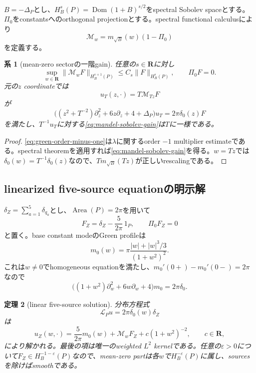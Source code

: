 \documentclass[11pt,a4paper]{ltjsarticle}
\newtheorem{theorem}{定理}[section]
\newtheorem{corollary}[theorem]{系}
\theoremstyle{definition}
\theoremstyle{remark}
\newcommand{\RR}{\mathbf R}
\newcommand{\eps}{\varepsilon}
\begin{document}
$B=-\Delta_P$とし、$H_B^s(P)=\operatorname{Dom}(1+B)^{s/2}$をspectral Sobolev spaceとする。$\Pi_0$をconstantsへのorthogonal projectionとする。spectral functional calculusにより
\[
 \mathcal M_w=m_{\sqrt B}(w)(1-\Pi_0)
\]
を定義する。

\begin{corollary}[mean-zero sectorの一階gain]\label{cor:mandel-one-derivative-gain}
任意の$s\in\RR$に対し
\begin{equation}\label{eq:mandel-sobolev-gain}
 \sup_{w\in\RR}
 \|\mathcal M_wF\|_{H_B^{s+1}(P)}
 \le C_s\|F\|_{H_B^s(P)},
 \qquad \Pi_0F=0.
\end{equation}
元の$z$ coordinateでは
\[
 u_T(z,\cdot)=T\mathcal M_{Tz}F
\]
が
\[
 \bigl((z^2+T^{-2})\partial_z^2+6z\partial_z+4+\Delta_P\bigr)u_T
 =2\pi\delta_0(z)F
\]
を満たし、$T^{-1}u_T$に対する\eqref{eq:mandel-sobolev-gain}は$T$に一様である。
\end{corollary}

\begin{proof}
\eqref{eq:green-order-minus-one}は$\lambda$に関するorder $-1$ multiplier estimateである。spectral theoremを適用すれば\eqref{eq:mandel-sobolev-gain}を得る。$w=Tz$では$\delta_0(w)=T^{-1}\delta_0(z)$なので、$T m_{\sqrt B}(Tz)$が正しいrescalingである。
\end{proof}

\subsection{linearized five-source equationの明示解}

$\delta_Z=\sum_{a=1}^5\delta_{q_a}$とし、$\operatorname{Area}(P)=2\pi$を用いて
\begin{equation}\label{eq:source-mean-zero-decomposition}
 F_Z=\delta_Z-\frac5{2\pi}\,1_P,
 \qquad \Pi_0F_Z=0
\end{equation}
と置く。base constant modeのGreen profileは
\begin{equation}\label{eq:m0-explicit}
 m_0(w)
 =\pi\frac{|w|+|w|^3/3}{(1+w^2)^2}.
\end{equation}
これは$w\ne0$でhomogeneous equationを満たし、$m_0'(0+)-m_0'(0-)=2\pi$なので
\[
 \bigl((1+w^2)\partial_w^2+6w\partial_w+4\bigr)m_0
 =2\pi\delta_0.
\]

\begin{theorem}[linear five-source solution]\label{thm:linear-five-source}
分布方程式
\begin{equation}\label{eq:linear-five-source-equation}
 \mathscr L_Pu
 =2\pi\delta_0(w)\delta_Z
\end{equation}
は
\begin{equation}\label{eq:linear-five-source-solution}
 u_Z(w,\cdot)
 =\frac5{2\pi}m_0(w)
 +\mathcal M_wF_Z
 +c(1+w^2)^{-2},
 \qquad c\in\RR,
\end{equation}
により解かれる。最後の項は唯一のweighted $L^2$ kernelである。任意の$\eps>0$について$F_Z\in H_B^{-1-\eps}(P)$なので、mean-zero partは各$w$で$H_B^{-\eps}(P)$に属し、sourcesを除けばsmoothである。
\end{theorem}
\end{document}
